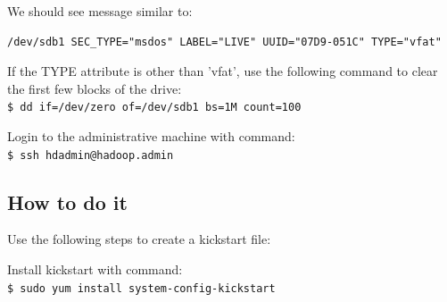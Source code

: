 We should see message similar to:
\lstset{style=bashstyle}
\begin{lstlisting}
/dev/sdb1 SEC_TYPE="msdos" LABEL="LIVE" UUID="07D9-051C" TYPE="vfat"
\end{lstlisting}

If the TYPE attribute is other than 'vfat', use the following command to clear the first few blocks of the drive: \\
\verb|$ dd if=/dev/zero of=/dev/sdb1 bs=1M count=100|

Login to the administrative machine with command: \\
\verb|$ ssh hdadmin@hadoop.admin|

\subsection*{How to do it}
Use the following steps to create a kickstart file:

Install kickstart with command: \\
\verb|$ sudo yum install system-config-kickstart|

